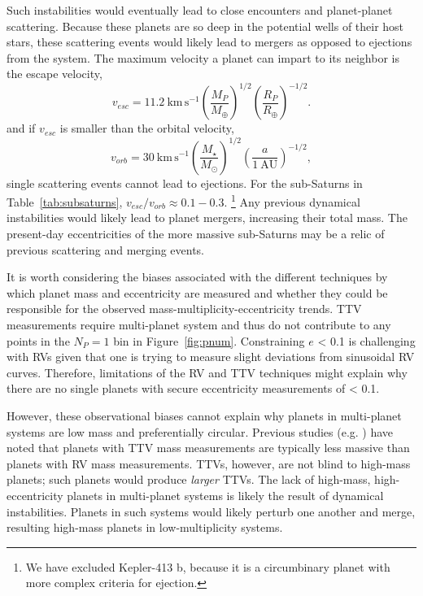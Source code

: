 \documentclass[preprint2]{aastex6}
\newcommand{\Mstar}{\ensuremath{M_{\star}}\xspace}
\newcommand{\Mp}{\ensuremath{M_{P}}\xspace}
\newcommand{\vesc}{\ensuremath{v_{esc}}\xspace}
\newcommand{\vorb}{\ensuremath{v_{orb}}\xspace}
\newcommand{\Rp}{\ensuremath{R_P}\xspace}
\newcommand{\kms}{\ensuremath{\mathrm{km}\,\mathrm{s}^{-1}}\xspace}
\newcommand{\AU}{\ensuremath{\mathrm{AU}}\xspace}
\newcommand{\Me}{\ensuremath{M_{\oplus}}\xspace}
\renewcommand{\Re}{\ensuremath{R_{\oplus}}\xspace}
\newcommand{\Msun}{\ensuremath{M_{\odot}}\xspace}
\begin{document}
Such instabilities would eventually lead to close encounters and planet-planet scattering. Because these planets are so deep in the potential wells of their host stars, these scattering events would likely lead to mergers as opposed to ejections from the system. The maximum velocity a planet can impart to its neighbor is the escape velocity, 
\[
\vesc = 11.2~\kms \left(\frac{\Mp}{\Me}\right)^{1/2} \left(\frac{\Rp}{\Re}\right)^{-1/2}.
\]
and if \vesc is smaller than the orbital velocity,
\[
\vorb = 30~\kms \left(\frac{\Mstar}{\Msun}\right)^{1/2} \left(\frac{a}{1~\AU}\right)^{-1/2},
\]
single scattering events cannot lead to ejections. For the sub-Saturns in Table~\ref{tab:subsaturns}, $\vesc/\vorb \approx 0.1-0.3$.%
\footnote{
We have excluded Kepler-413 b, because it is a circumbinary planet with more complex criteria for ejection.
}
Any previous dynamical instabilities would likely lead to planet mergers, increasing their total mass. The present-day eccentricities of the more massive sub-Saturns may be a relic of previous scattering and merging events. 

It is worth considering the biases associated with the different techniques by which planet mass and eccentricity are measured and whether they could be responsible for the observed mass-multiplicity-eccentricity trends. TTV measurements require multi-planet system and thus do not contribute to any points in the $N_P = 1$ bin in Figure~\ref{fig:pnum}. Constraining $e$ < 0.1 is challenging with RVs given that one is trying to measure slight deviations from sinusoidal RV curves. Therefore, limitations of the RV and TTV techniques might explain why there are no single planets with secure eccentricity measurements of < 0.1.

However, these observational biases cannot explain why planets in multi-planet systems are low mass and preferentially circular. Previous studies (e.g. \citealt{Weiss14}) have noted that planets with TTV mass measurements are typically less massive than planets with RV mass measurements. TTVs, however, are not blind to high-mass planets; such planets would produce {\em larger} TTVs. The lack of high-mass, high-eccentricity planets in multi-planet systems is likely the result of dynamical instabilities. Planets in such systems would likely perturb one another and merge, resulting high-mass planets in low-multiplicity systems.

\end{document}
